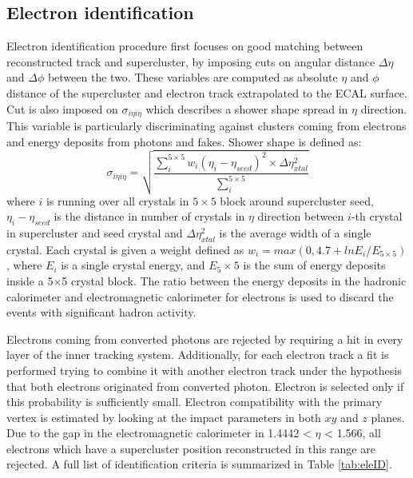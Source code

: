 \subsection{Electron identification}

Electron identification procedure first focuses on good matching between reconstructed track and supercluster, by imposing cuts on angular distance $\Delta \eta$ and $\Delta \phi$ between the two. These variables are computed as absolute $\eta$ and $\phi$ distance of the supercluster and electron track extrapolated to the ECAL surface. Cut is also imposed on $\sigma_{i\eta i\eta}$ which describes a shower shape spread in $\eta$ direction. This variable is particularly discriminating against clusters coming from electrons and energy deposits from photons and fakes. Shower shape is defined as:
\begin{equation}
\sigma_{i\eta i\eta} = \sqrt{\frac{\sum_{i}^{5\times 5} w_i(\eta_i-\eta_{seed})^2\times \Delta \eta^2_{xtal} }{\sum_{i}^{5\times 5}}}
\end{equation}
where $i$ is running over all crystals in $5\times5$ block around supercluster seed, $\eta_i-\eta_{seed}$ is the distance in number of crystals in $\eta$ direction between $i$-th crystal in supercluster and seed crystal and $\Delta \eta^2_{xtal}$ is the average width of a single crystal. Each crystal is given a weight defined as $w_i=max(0,4.7+lnE_i/E_{5\times5})$, where $E_i$ is a single crystal energy, and $E_5\times 5$ is the sum of energy deposits inside a 5$\times$5 crystal block. 
The ratio between the energy deposits in the hadronic calorimeter and electromagnetic calorimeter for electrons is used to discard the events with significant hadron activity.
\par Electrons coming from converted photons are rejected by requiring a hit in every layer of the inner tracking system. Additionally, for each electron track a fit is performed trying to combine it with another electron track under the hypothesis that both electrons originated from converted photon. Electron is selected only if this probability is sufficiently small. Electron compatibility with the primary vertex is estimated by looking at the impact parameters in both $xy$ and $z$ planes. Due to the gap in the electromagnetic calorimeter in 1.4442 < $\eta$ < 1.566, all electrons which have a supercluster position reconstructed in this range are rejected. A full list of identification criteria is summarized in Table \ref{tab:eleID}.
